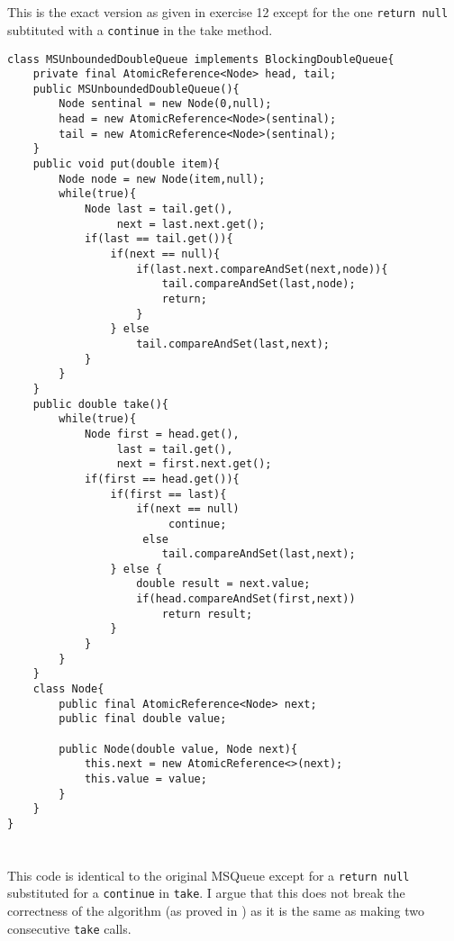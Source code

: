 \documentclass{ituhandin}
\begin{document}
\section{}
This is the exact version as given in exercise 12 except for the one \texttt{return null} subtituted with a \texttt{continue} in the take method.
\begin{lstlisting}[caption=Implementation of the \texttt{MSUnboundedDoubleQueue}]
class MSUnboundedDoubleQueue implements BlockingDoubleQueue{
    private final AtomicReference<Node> head, tail;
    public MSUnboundedDoubleQueue(){
        Node sentinal = new Node(0,null);
        head = new AtomicReference<Node>(sentinal);
        tail = new AtomicReference<Node>(sentinal);
    }
    public void put(double item){
        Node node = new Node(item,null);
        while(true){
            Node last = tail.get(), 
                 next = last.next.get();
            if(last == tail.get()){
                if(next == null){
                    if(last.next.compareAndSet(next,node)){
                        tail.compareAndSet(last,node);
                        return;
                    }
                } else 
                    tail.compareAndSet(last,next);
            }
        }
    }
    public double take(){ 
        while(true){
            Node first = head.get(),
                 last = tail.get(),
                 next = first.next.get();
            if(first == head.get()){
                if(first == last){
                    if(next == null)
                         continue;
                     else 
                        tail.compareAndSet(last,next);
                } else {
                    double result = next.value;
                    if(head.compareAndSet(first,next))
                        return result;
                }
            }
        }
    }
    class Node{
        public final AtomicReference<Node> next;
        public final double value;

        public Node(double value, Node next){
            this.next = new AtomicReference<>(next);
            this.value = value;
        }
    }
}
\end{lstlisting}

\section{}

This code is identical to the original MSQueue except for a \texttt{return null} substituted for a \texttt{continue} in \texttt{take}. I argue that this does not break the correctness of the algorithm (as proved in \cite{michael1996simple}) as it is the same as making two consecutive \texttt{take} calls.
\end{document}
